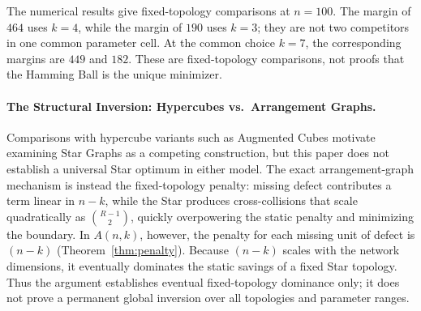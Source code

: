 The numerical results give fixed-topology comparisons at $n=100$.  The margin
of $464$ uses $k=4$, while the margin of $190$ uses $k=3$; they are not two
competitors in one common parameter cell.  At the common choice $k=7$, the
corresponding margins are $449$ and $182$.  These are fixed-topology
comparisons, not proofs that the Hamming Ball is the unique minimizer.

\paragraph{The Structural Inversion: Hypercubes vs.\ Arrangement Graphs.}
Comparisons with hypercube variants such as Augmented Cubes
\cite{cheng2023augmented} motivate examining Star Graphs as a competing
construction, but this paper does not establish a universal Star optimum in
either model.  The exact arrangement-graph mechanism is instead the
fixed-topology penalty: missing defect contributes a term linear in $n-k$,
while the Star produces cross-collisions that
scale quadratically as $\binom{R-1}{2}$, quickly overpowering the static penalty
and minimizing the boundary. In $A(n,k)$, however, the penalty for each missing
unit of defect is $(n-k)$ (Theorem~\ref{thm:penalty}). Because $(n-k)$ scales
with the network dimensions, it eventually dominates the static savings of a
fixed Star topology. Thus the argument establishes eventual fixed-topology
dominance only; it does not prove a permanent global inversion over all
topologies and parameter ranges.
